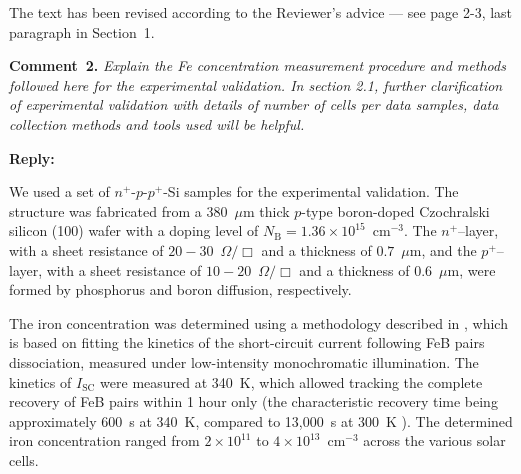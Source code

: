 \documentclass[a4paper,fleqn]{cas-sc}
\begin{document}
The text has been revised according to the Reviewer's advice --- see page 2-3, last paragraph in Section~1.





\vspace{1cm}
\noindent
\textcolor[rgb]{0.00,0.50,1.00}{\textbf{Comment~2.}}
\emph{Explain the Fe concentration measurement procedure and methods followed here for the experimental validation.
In section 2.1, further clarification of experimental validation with details of number of cells per data samples, data collection methods and tools used will be helpful.}

\noindent
\textcolor[rgb]{0.51,0.00,0.00}{\textbf{Reply:}}

We used a set of $n^+$-$p$-$p^+$-Si samples for the experimental validation.
The structure was fabricated from a 380~$\mu$m thick $p$-type boron-doped Czochralski silicon (100) wafer
with a doping level of $N_\mathrm{B}=1.36\times10^{15}$~cm$^{-3}$.
The $n^+$--layer, with a sheet resistance of $20-30$~$\Omega/\Box$ and a thickness of $0.7$~$\mu$m,
and the $p^+$--layer, with a sheet resistance of $10-20$~$\Omega/\Box$ and a thickness of $0.6$~$\mu$m,
were formed by phosphorus and boron diffusion, respectively.

The iron concentration was determined using a methodology described in \cite{Olikh2022:JMatSci,Olikh2021JAP},
which is based on fitting the kinetics of the short-circuit current following FeB pairs dissociation,
measured under low-intensity monochromatic illumination.
The kinetics of $I_\mathrm{SC}$ were measured at 340~K, which allowed tracking the complete recovery of FeB pairs within 1 hour only
(the characteristic recovery time being approximately 600~s at 340~K, compared to 13,000~s at 300~K \cite{FeBAssJAP2014,FeBKin2019}).
The determined iron concentration ranged from $2\times10^{11}$ to $4\times10^{13}$~cm$^{-3}$ across the various solar cells.
\end{document}
